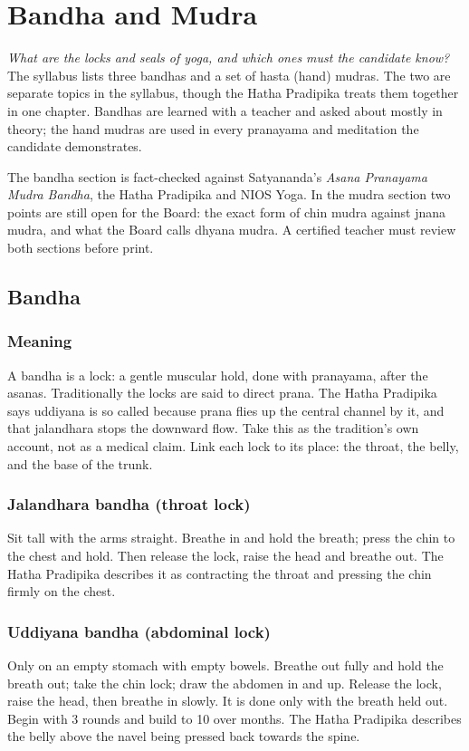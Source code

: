 \chapter{Bandha and Mudra}
\label{ch:bandha-mudra}

\emph{What are the locks and seals of yoga, and which ones must the candidate know?}
The syllabus lists three bandhas and a set of hasta (hand) mudras. The two are separate topics in the syllabus, though the Hatha Pradipika treats them together in one chapter. Bandhas are learned with a teacher and asked about mostly in theory; the hand mudras are used in every pranayama and meditation the candidate demonstrates.

\begin{unverified}
The bandha section is fact-checked against Satyananda's \emph{Asana Pranayama Mudra Bandha}, the Hatha Pradipika and NIOS Yoga. In the mudra section two points are still open for the Board: the exact form of chin mudra against jnana mudra, and what the Board calls dhyana mudra. A certified teacher must review both sections before print.
\end{unverified}

\section{Bandha}

\subsection*{Meaning}
A bandha is a lock: a gentle muscular hold, done with pranayama, after the asanas. Traditionally the locks are said to direct prana. The Hatha Pradipika says uddiyana is so called because prana flies up the central channel by it, and that jalandhara stops the downward flow. Take this as the tradition's own account, not as a medical claim. Link each lock to its place: the throat, the belly, and the base of the trunk.

\subsection*{Jalandhara bandha (throat lock)}
Sit tall with the arms straight. Breathe in and hold the breath; press the chin to the chest and hold. Then release the lock, raise the head and breathe out. The Hatha Pradipika describes it as contracting the throat and pressing the chin firmly on the chest.

\subsection*{Uddiyana bandha (abdominal lock)}
Only on an empty stomach with empty bowels. Breathe out fully and hold the breath out; take the chin lock; draw the abdomen in and up. Release the lock, raise the head, then breathe in slowly. It is done only with the breath held out. Begin with 3 rounds and build to 10 over months. The Hatha Pradipika describes the belly above the navel being pressed back towards the spine.

